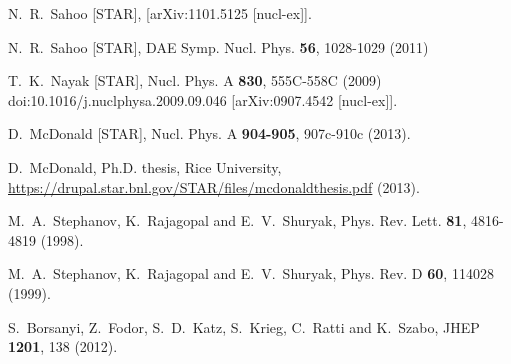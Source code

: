\begin{thebibliography}{99}
N.~R.~Sahoo [STAR],
[arXiv:1101.5125 [nucl-ex]].

N.~R.~Sahoo [STAR],
DAE Symp. Nucl. Phys. \textbf{56}, 1028-1029 (2011)

T.~K.~Nayak [STAR],
Nucl. Phys. A \textbf{830}, 555C-558C (2009)
doi:10.1016/j.nuclphysa.2009.09.046
[arXiv:0907.4542 [nucl-ex]].

D.~McDonald [STAR],
Nucl. Phys. A \textbf{904-905}, 907c-910c (2013).

D.~McDonald,
Ph.D. thesis, Rice University, \href{https://drupal.star.bnl.gov/STAR/files/mcdonaldthesis.pdf}{https://drupal.star.bnl.gov/STAR/files/mcdonaldthesis.pdf} (2013).


M.~A.~Stephanov, K.~Rajagopal and E.~V.~Shuryak,
Phys. Rev. Lett. \textbf{81}, 4816-4819 (1998).

M.~A.~Stephanov, K.~Rajagopal and E.~V.~Shuryak,
Phys. Rev. D \textbf{60}, 114028 (1999).

  S.~Borsanyi, Z.~Fodor, S.~D.~Katz, S.~Krieg, C.~Ratti and K.~Szabo,
  JHEP {\bf 1201}, 138 (2012).



\end{thebibliography}
